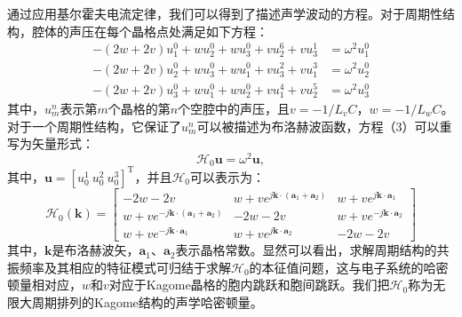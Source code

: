 通过应用基尔霍夫电流定律，我们可以得到了描述声学波动的方程。对于周期性结构，腔体的声压在每个晶格点处满足如下方程：
\begin{subequations}\label{eq3-3}
  \begin{align}
  -(2w + 2v)u_{1}^{0} + wu_{2}^{0} + wu_{3}^{0} + vu_{2}^{6} + vu_{3}^{1} &= \omega^{2}u_{1}^{0}\label{eq:sub1}\\
  -(2w + 2v)u_{2}^{0} + wu_{3}^{0} + wu_{1}^{0} + vu_{3}^{2} + vu_{1}^{3} &= \omega^{2}u_{2}^{0}\label{eq:sub2}\\
  -(2w + 2v)u_{3}^{0} + wu_{1}^{0} + wu_{2}^{0} + vu_{1}^{4} + vu_{2}^{5} &= \omega^{2}u_{3}^{0}\label{eq:sub3}
  \end{align}
\end{subequations}
其中，$u_m^n$表示第$m$个晶格的第$n$个空腔中的声压，且$v = -1/L_vC$，$w = -1/L_wC$。对于一个周期性结构，它保证了$u_m^n$可以被描述为布洛赫波函数，方程（3）可以重写为矢量形式：
\begin{equation}\label{eq3-4}
  \mathcal{H}_{0}\mathbf{u} = \omega^{2}\mathbf{u},
\end{equation}
其中，$\mathbf{u} = [u_0^1\ u_0^2\ u_0^3]^{\mathrm{T}}$，并且$\mathcal{H}_{0}$可以表示为：
\begin{equation}\label{eq3-5}
  \mathcal{H}_{0}(\mathbf{k}) = 
  \begin{bmatrix}
  -2w - 2v & w + ve^{j\mathbf{k}\cdot(\mathbf{a}_{1}+\mathbf{a}_{2})} & w + ve^{j\mathbf{k}\cdot\mathbf{a}_{1}} \\
  w + ve^{-j\mathbf{k}\cdot(\mathbf{a}_{1}+\mathbf{a}_{2})} & -2w - 2v & w + ve^{-j\mathbf{k}\cdot\mathbf{a}_{2}} \\
  w + ve^{-j\mathbf{k}\cdot\mathbf{a}_{1}} & w + ve^{j\mathbf{k}\cdot\mathbf{a}_{2}} & -2w - 2v
  \end{bmatrix}
\end{equation}
其中，$\mathbf{k}$是布洛赫波矢，$\mathbf{a}_{1}$、$\mathbf{a}_{2}$表示晶格常数。显然可以看出，求解周期结构的共振频率及其相应的特征模式可归结于求解$\mathcal{H}_{0}$的本征值问题，这与电子系统的哈密顿量相对应，$w$和$v$对应于Kagome晶格的胞内跳跃和胞间跳跃。我们把$\mathcal{H}_{0}$称为无限大周期排列的Kagome结构的声学哈密顿量。

